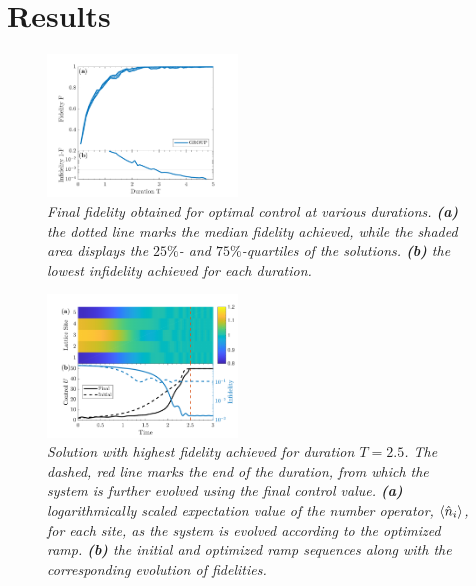 \documentclass[%
 reprint,
 amsmath,amssymb,
 aps,
pra,
]{revtex4-1}
\begin{document}
  

\section{Results}


\begin{figure}[h!]
    \centering
    \includegraphics[width=0.45\textwidth]{Figures/FidelityDuration.pdf}
    \caption{\textit{Final fidelity obtained for optimal control at various durations. \textbf{(a)} the dotted line marks the median fidelity achieved, while the shaded area displays the $25\%$- and $75\%$-quartiles of the solutions. \textbf{(b)} the lowest infidelity achieved for each duration. }}
    \label{fig:FidelityDuration}
\end{figure}

\begin{figure}[h!]
    \centering
    \includegraphics[width=0.45\textwidth]{Figures/OptRamp.pdf}
    \caption{\textit{Solution with highest fidelity achieved for duration $T = 2.5$. The dashed, red line marks the end of the duration, from which the system is further evolved using the final control value. \textbf{(a)} logarithmically scaled expectation value of the number operator, $\braket{\hat{n}_i}$, for each site, as the system is evolved according to the optimized ramp. \textbf{(b)} the initial and optimized ramp sequences along with the corresponding evolution of fidelities.}}
    \label{fig:OptRamp}
\end{figure}
\end{document}
